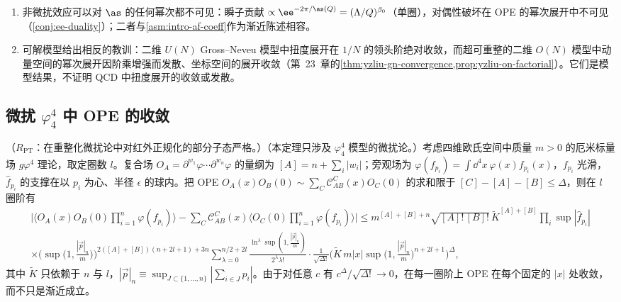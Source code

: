 \begin{remark}[非微扰地位]
\begin{enumerate}[label=(\roman*),leftmargin=1.8em,itemsep=1pt,topsep=2pt]
\item 非微扰效应可以对 $\as$ 的任何幂次都不可见：瞬子贡献 $\propto\ee^{-2\pi/\as(Q)}=(\Lambda/Q)^{\beta_0}$（单圈），对偶性破坏在 OPE 的幂次展开中不可见（\cref{conj:ee-duality}）；二者与\cref{asm:intro-af-coeff}作为渐近陈述相容。
\item 可解模型给出相反的教训：二维 $U(N)$ Gross--Neveu 模型中扭度展开在 $1/N$ 的领头阶绝对收敛，而超可重整的二维 $O(N)$ 模型中动量空间的幂次展开因阶乘增强而发散、坐标空间的展开收敛（第~23~章的\cref{thm:yzliu-gn-convergence,prop:yzliu-on-factorial}）。它们是模型结果，不证明 QCD 中扭度展开的收敛或发散。
\end{enumerate}
\end{remark}

\subsection{微扰 \texorpdfstring{$\varphi^4_4$}{phi4} 中 OPE 的收敛}

\begin{theorem}\label{thm:power-ope-convergence}
（$R_{\mathrm{PT}}$：在重整化微扰论中对红外正规化的部分子态严格。）（本定理只涉及 $\varphi^4_4$ 模型的微扰论。）考虑四维欧氏空间中质量 $m>0$ 的厄米标量场 $g\varphi^4$ 理论，取定圈数 $l$。复合场 $O_A=\partial^{w_1}\varphi\cdots\partial^{w_n}\varphi$ 的量纲为 $[A]=n+\sum_i|w_i|$；旁观场为 $\varphi(f_{p_i})=\int\dd^4x\,\varphi(x)f_{p_i}(x)$，$f_{p_i}$ 光滑，$\hat f_{p_i}$ 的支撑在以 $p_i$ 为心、半径 $\epsilon$ 的球内。把 OPE $O_A(x)O_B(0)\sim\sum_C\mathcal C^C_{AB}(x)O_C(0)$ 的求和限于 $[C]-[A]-[B]\le\Delta$，则在 $l$ 圈阶有
\begin{multline}\label{eq:power-hk}
\Big|\Big\langle O_A(x)O_B(0)\prod_{i=1}^n\varphi(f_{p_i})\Big\rangle-\sum_C\mathcal C^C_{AB}(x)\Big\langle O_C(0)\prod_{i=1}^n\varphi(f_{p_i})\Big\rangle\Big|
\le m^{[A]+[B]+n}\sqrt{[A]!\,[B]!}\,\tilde K^{[A]+[B]}\prod_i\sup|\hat f_{p_i}|\\
\times\Big(\sup\big(1,\tfrac{|\vec p|_n}{m}\big)\Big)^{2([A]+[B])(n+2l+1)+3n}\sum_{\lambda=0}^{n/2+2l}\frac{\ln^\lambda\sup(1,\frac{|\vec p|_n}{m})}{2^\lambda\lambda!}
\cdot\frac{1}{\sqrt{\Delta!}}\Big(\tilde K\,m|x|\sup\big(1,\tfrac{|\vec p|_n}{m}\big)^{n+2l+1}\Big)^{\Delta},
\end{multline}
其中 $\tilde K$ 只依赖于 $n$ 与 $l$，$|\vec p|_n\equiv\sup_{J\subset\{1,\dots,n\}}|\sum_{i\in J}p_i|$\cite[定理~3]{Hollands:2011gf}。由于对任意 $c$ 有 $c^\Delta/\sqrt{\Delta!}\to0$，在每一圈阶上 OPE 在每个固定的 $|x|$ 处收敛，而不只是渐近成立。
\end{theorem}

